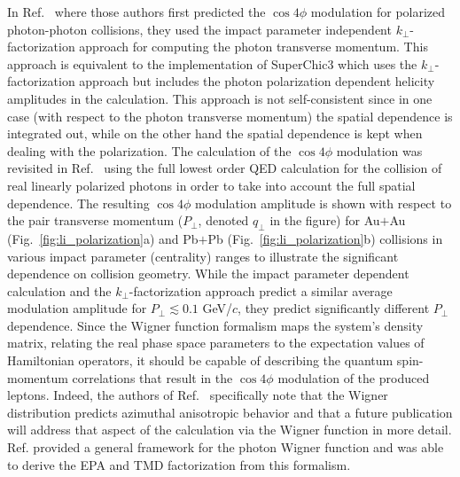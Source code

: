 \documentclass[12pt,epjc3]{svjour3}\sloppy
\begin{document}
In Ref.~\cite{liProbingLinearPolarization2019} where those authors first predicted the $\cos4\phi$ modulation for polarized photon-photon collisions, they used the impact parameter independent $k_\perp$-factorization approach for computing the photon transverse momentum. 
This approach is equivalent to the implementation of SuperChic3 which uses the $k_\perp$-factorization approach but includes the photon polarization dependent helicity amplitudes in the calculation. 
This approach is not self-consistent since in one case (with respect to the photon transverse momentum) the spatial dependence is integrated out, while on the other hand the spatial dependence is kept when dealing with the polarization. 
The calculation of the $\cos4\phi$ modulation was revisited in Ref.~\cite{liImpactParameterDependence2020} using the full lowest order QED calculation for the collision of real linearly polarized photons in order to take into account the full spatial dependence. 
The resulting $\cos4\phi$ modulation amplitude is shown with respect to the pair transverse momentum ($P_\perp$, denoted $q_\perp$ in the figure) for Au$+$Au (Fig.~\ref{fig:li_polarization}a) and Pb$+$Pb (Fig.~\ref{fig:li_polarization}b) collisions in various impact parameter (centrality) ranges to illustrate the significant dependence on collision geometry. 
While the impact parameter dependent calculation and the $k_\perp$-factorization approach predict a similar average modulation amplitude for $P_\perp \lesssim 0.1 $ GeV/$c$, they predict significantly different $P_\perp$ dependence.
Since the Wigner function formalism maps the system's density matrix, relating the real phase space parameters to the expectation values of Hamiltonian operators, it should be capable of describing the quantum spin-momentum correlations that result in the $\cos4\phi$ modulation of the produced leptons. Indeed, the authors of Ref.~\cite{klusek-gawendaCentralityDependenceDilepton2021} specifically note that the Wigner distribution predicts azimuthal anisotropic behavior and that a future publication will address that aspect of the calculation via the Wigner function in more detail. Ref.\cite{Wang:2021kxm} provided a  general framework for the photon Wigner function and was able to derive the EPA and TMD factorization from this formalism. 
\end{document}
